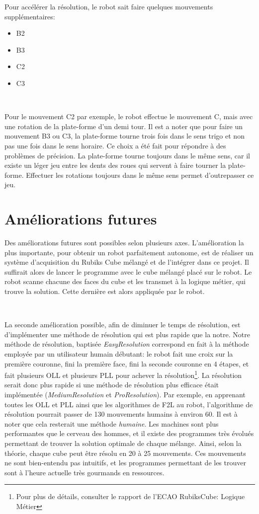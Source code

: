 \documentclass[a4paper,12pt]{article}
\begin{document}
Pour accélérer la résolution, le robot sait faire quelques mouvements supplémentaires:
\begin{itemize}
 \item B2
 \item B3
 \item C2
 \item C3
\end{itemize}

~


Pour le mouvement C2 par exemple, le robot effectue le mouvement C, mais avec une rotation de la plate-forme d'un demi tour.
Il est a noter que pour faire un mouvement B3 ou C3, la plate-forme tourne trois fois dans le sens trigo et non pas une fois dans le sens horaire. Ce choix a été fait pour répondre à des problèmes de précision. La plate-forme tourne toujours dans le même sens, car il existe un léger jeu entre les dents des roues qui servent à faire tourner la plate-forme. Effectuer les rotations toujours dans le même sens permet d'outrepasser ce jeu.


\section{Améliorations futures}

Des améliorations futures sont possibles selon plusieurs axes. L'amélioration la plus importante, pour obtenir un robot parfaitement autonome, est de réaliser un système d'acquisition du Rubiks Cube mélangé et de l'intégrer dans ce projet. Il suffirait alors de lancer le programme avec le cube mélangé placé sur le robot. Le robot scanne chacune des faces du cube et les transmet à la logique métier, qui trouve la solution. Cette dernière est alors appliquée par le robot.


~

La seconde amélioration possible, afin de diminuer le temps de résolution, est d'implémenter une méthode de résolution qui est plus rapide que la notre. Notre méthode de résolution, baptisée \textit{EasyResolution} correspond en fait à la méthode employée par un utilisateur humain débutant: le robot fait une croix sur la première couronne, fini la première face, fini la seconde couronne en 4 étapes, et fait plusieurs OLL et plusieurs PLL pour achever la résolution\footnote{Pour plus de détails, consulter le rapport de l'ECAO RubiksCube: Logique Métier}. La résolution serait donc plus rapide si une méthode de résolution plus efficace était implémentée (\textit{MediumResolution} et \textit{ProResolution}). Par exemple, en apprenant toutes les OLL et PLL ainsi que les algorithmes de F2L au robot, l'algorithme de résolution pourrait passer de 130 mouvements humains à environ 60. Il est à noter que cela resterait une méthode \textit{humaine}. Les machines sont plus performantes que le cerveau des hommes, et il existe des programmes très évolués permettant de trouver la solution optimale de chaque mélange. Ainsi, selon la théorie, chaque cube peut être résolu en 20 à 25 mouvements. Ces mouvements ne sont bien-entendu pas intuitifs, et les programmes permettant de les trouver sont à l'heure actuelle très gourmands en ressources. 
\end{document}
